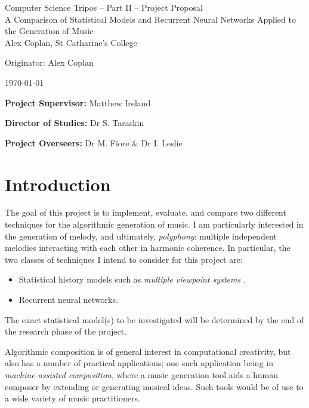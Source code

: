 \documentclass[12pt,a4paper,twoside]{article}
\begin{document}
\cleanlookdateon

\begin{center}
\Large
Computer Science Tripos -- Part II -- Project Proposal\\[4mm]
\LARGE
A Comparison of Statistical Models and Recurrent Neural Networks Applied to the
Generation of Music\\[4mm]

\large
Alex Coplan, St Catharine's College

Originator: Alex Coplan

\today
\end{center}

\vspace{5mm}

\textbf{Project Supervisor:} Matthew Ireland

\textbf{Director of Studies:} Dr S. Taraskin

\textbf{Project Overseers:} Dr M. Fiore \& Dr I. Leslie


\section*{Introduction}

The goal of this project is to implement, evaluate, and compare two different
techniques for the algorithmic generation of music. I am particularly interested
in the generation of melody, and ultimately, \emph{polyphony}: multiple
independent melodies interacting with each other in harmonic coherence. In
particular, the two classes of techniques I intend to consider for this project
are:
\begin{itemize}[itemsep=0mm]
	\item Statistical history models such as \emph{multiple viewpoint
			systems} \cite{conklin1995viewpoints}.
	\item Recurrent neural networks.
\end{itemize}

The exact statistical model(s) to be investigated will be determined by the end
of the research phase of the project.

Algorithmic composition is of general interest in computational creativity, but
also has a number of practical applications; one such application being in
\emph{machine-assisted composition}, where a music generation tool aids a human
composer by extending or generating musical ideas. Such tools would be of use to
a wide variety of music practitioners.
\end{document}
